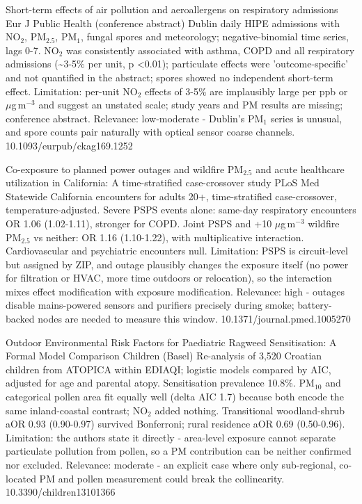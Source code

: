 \documentclass[10pt]{article}
\begin{document}
{Short-term effects of air pollution and aeroallergens on respiratory admissions}
{Eur J Public Health (conference abstract)}
{Dublin daily HIPE admissions with NO$_2$, PM$_{2.5}$, PM$_{1}$, fungal spores and meteorology; negative-binomial time series, lags 0-7. NO$_2$ was consistently associated with asthma, COPD and all respiratory admissions (\textasciitilde{}3-5\% per unit, p <0.01); particulate effects were 'outcome-specific' and not quantified in the abstract; spores showed no independent short-term effect. Limitation: per-unit NO$_2$ effects of 3-5\% are implausibly large per ppb or $\mu$g\,m$^{-3}$ and suggest an unstated scale; study years and PM results are missing; conference abstract. Relevance: low-moderate - Dublin's PM$_{1}$ series is unusual, and spore counts pair naturally with optical sensor coarse channels.}
{10.1093/eurpub/ckag169.1252}

{Co-exposure to planned power outages and wildfire PM$_{2.5}$ and acute healthcare utilization in California: A time-stratified case-crossover study}
{PLoS Med}
{Statewide California encounters for adults 20+, time-stratified case-crossover, temperature-adjusted. Severe PSPS events alone: same-day respiratory encounters OR 1.06 (1.02-1.11), stronger for COPD. Joint PSPS and +10 $\mu$g\,m$^{-3}$ wildfire PM$_{2.5}$ vs neither: OR 1.16 (1.10-1.22), with multiplicative interaction. Cardiovascular and psychiatric encounters null. Limitation: PSPS is circuit-level but assigned by ZIP, and outage plausibly changes the exposure itself (no power for filtration or HVAC, more time outdoors or relocation), so the interaction mixes effect modification with exposure modification. Relevance: high - outages disable mains-powered sensors and purifiers precisely during smoke; battery-backed nodes are needed to measure this window.}
{10.1371/journal.pmed.1005270}

{Outdoor Environmental Risk Factors for Paediatric Ragweed Sensitisation: A Formal Model Comparison}
{Children (Basel)}
{Re-analysis of 3,520 Croatian children from ATOPICA within EDIAQI; logistic models compared by AIC, adjusted for age and parental atopy. Sensitisation prevalence 10.8\%. PM$_{10}$ and categorical pollen area fit equally well (delta AIC 1.7) because both encode the same inland-coastal contrast; NO$_2$ added nothing. Transitional woodland-shrub aOR 0.93 (0.90-0.97) survived Bonferroni; rural residence aOR 0.69 (0.50-0.96). Limitation: the authors state it directly - area-level exposure cannot separate particulate pollution from pollen, so a PM contribution can be neither confirmed nor excluded. Relevance: moderate - an explicit case where only sub-regional, co-located PM and pollen measurement could break the collinearity.}
{10.3390/children13101366}
\end{document}
